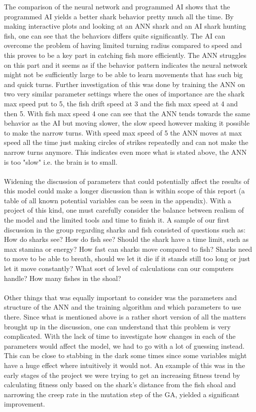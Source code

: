 The comparison of the neural network and programmed AI shows that the
programmed AI yields a better shark behavior pretty much all the time. By making interactive plots and looking at an ANN shark and an AI shark hunting fish, one can see that the behaviors differs quite significantly. The AI can overcome the problem of having limited turning radius compared to speed and this proves to be a key part in catching fish more efficiently. The ANN struggles on this part and it seems as if the behavior pattern indicates the neural network might not be sufficiently large to be able to learn movements that has such big and quick turns. Further investigation of this was done by training the ANN on two very similar parameter settings where the ones of importance are the shark max speed put to 5, the fish drift speed at 3 and the fish max speed at 4 and then 5. With fish max speed 4 one can see that the ANN tends towards the same behavior as the AI but moving slower, the slow speed however making it possible to make the narrow turns. With speed max speed of 5 the ANN moves at max speed all the time just making circles of strikes repeatedly and can not make the narrow turns anymore. This indicates even more what is stated above, the ANN is too "slow" i.e. the brain is to small.\\
\\
Widening the discussion of parameters that could potentially affect the results of this model could make a longer discussion than is within scope of this report (a table of all known potential variables can be seen in the appendix). With a project of this kind, one must carefully consider the balance between realism of the model and the limited tools and time to finish it. A sample of our first discussion in the group regarding sharks and fish consisted of questions such as: How do sharks see? How do fish see? Should the shark have a time limit, such as max stamina or energy? How fast can sharks move compared to fish? Sharks need to move to be able to breath, should we let it die if it stands still too long or just let it move constantly? What sort of level of calculations can our computers handle? How many fishes in the shoal?\\
\\
Other things that was equally important to consider was the parameters and structure of the ANN and the training algorithm and which parameters to use there. Since what is mentioned above is a rather short version of all the matters brought up in the discussion, one can understand that this problem is very complicated. With the lack of time to investigate how changes in each of the parameters would affect the model, we had to go with a lot of guessing instead. This can be close to stabbing in the dark some times since some variables might have a huge effect where intuitively it would not. An example of this was in the early stages of the project we were trying to get an increasing fitness trend by calculating fitness only based on the shark's distance from the fish shoal and narrowing the creep rate in the mutation step of the GA, yielded a significant improvement.\\
